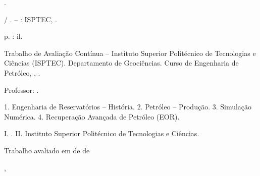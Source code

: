\documentclass[12pt,a4paper,oneside,brazilian,sumario=tradicional]{abntex2}
\begin{document}
\frenchspacing
\pretextual
\imprimircapa
\imprimirfolhaderosto

\begin{fichacatalografica}
  \thispagestyle{empty}
  \vspace*{\fill}
  \begin{center}
    \fontsize{9}{9}\selectfont
    \noindent
    \imprimirautor.

    \imprimirtitulo / \imprimirautor. -- \imprimirlocal: ISPTEC, \imprimirdata.

    \pageref{LastPage} p. : il.

    Trabalho de Avaliação Contínua -- Instituto Superior Politécnico de
    Tecnologias e Ciências (ISPTEC). Departamento de Geociências. Curso
    de Engenharia de Petróleo, \imprimirlocal, \imprimirdata.

    Professor: \imprimirorientador.

    1. Engenharia de Reservatórios -- História. 2. Petróleo -- Produção.
    3. Simulação Numérica. 4. Recuperação Avançada de Petróleo (EOR).

    I. \imprimirorientador. II. Instituto Superior Politécnico de Tecnologias e Ciências.
  \end{center}
\end{fichacatalografica}

\begin{folhadeaprovacao}
  \thispagestyle{empty}
  \begin{center}
    {\ABNTEXchapterfont\large\MakeUppercase{\imprimirautor}}
    \vspace*{1cm}
    \begin{center}
      \ABNTEXchapterfont\bfseries\large\MakeUppercase{\imprimirtitulo}
    \end{center}
    \vspace*{1cm}
    \hspace{.38\textwidth}
    \begin{minipage}{.56\textwidth}
      \imprimirpreambulo
    \end{minipage}
    \vspace*{1cm}
  \end{center}

  Trabalho avaliado em \underline{\hspace{1.8cm}} de
  \underline{\hspace{3.5cm}} de \underline{\hspace{1.2cm}}

  \vspace{1.5cm}

  \begin{center}
    \imprimirlocal, \imprimirdata
  \end{center}
\end{folhadeaprovacao}
\end{document}
